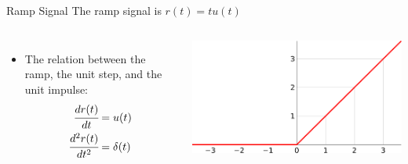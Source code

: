 \documentclass[aspectratio=169,xcolor=dvipsnames,svgnames,x11names,fleqn]{beamer}
\begin{document}
\begin{frame}{Ramp Signal}
The ramp signal is $r(t) = t u(t)$
\begin{columns}
    \begin{itemize}
        \item The relation between the ramp, the unit step, and the unit impulse:
        \begin{equation*}
            \begin{aligned}
                \cfrac{dr(t)}{dt} & = u(t)\\
                \cfrac{d^2r(t)}{dt^2} & = \delta(t)
            \end{aligned}
        \end{equation*}
    \end{itemize}
     \includegraphics[width=0.65\linewidth,trim=0 0 0 0cm,clip]{figures/ramp_function.png}
    \end{columns}
\end{frame}
\end{document}
